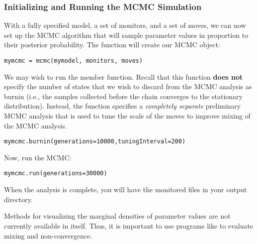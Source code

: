 \subsubsection{Initializing and Running the MCMC Simulation}

With a fully specified model, a set of monitors, and a set of moves, we can now set up the MCMC algorithm that will sample parameter values in proportion to their posterior probability. 
The  function will create our MCMC object:
{\tt \begin{snugshade*}
\begin{lstlisting}
mymcmc = mcmc(mymodel, monitors, moves)
\end{lstlisting}
\end{snugshade*}}
\iffalse
Notice that we also specified \cl{nruns=2} which means that \RevBayes will automatically run 2 independent MCMC runs.
You will find that the output is created in two files with extension \cl{\_run\_1} and \cl{\_run\_2} for each replicate and additionally the samples from both runs are combined into one file for more convenient post-processing.
\fi
We may wish to run the  member function.
Recall that this function \textbf{does not} specify the number of states that we wish to discard from the MCMC analysis as burnin (i.e., the samples collected before the chain converges to the stationary distribution).  
Instead, the  function specifies a \textit{completely separate} preliminary MCMC analysis that is used to tune the scale of the moves to improve mixing of the MCMC analysis.
{\tt \begin{snugshade*}
\begin{lstlisting}
mymcmc.burnin(generations=10000,tuningInterval=200)
\end{lstlisting}
\end{snugshade*}}


Now, run the MCMC:
{\tt \begin{snugshade*}
\begin{lstlisting}
mymcmc.run(generations=30000)
\end{lstlisting}
\end{snugshade*}}

When the analysis is complete, you will have the monitored files in your output directory.


Methods for visualizing the marginal densities of parameter values are not currently available in \RevBayes itself. 
Thus, it is important to use programs like \Tracer \citep{Rambaut2011} to evaluate mixing and non-convergence.


